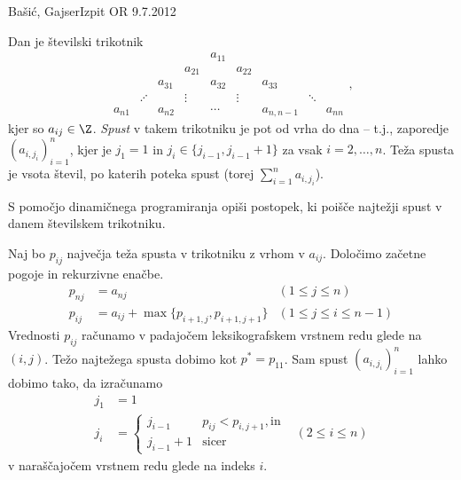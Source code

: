 \begin{naloga}{Bašić, Gajser}{Izpit OR 9.7.2012}
\begin{vprasanje}
Dan je številski trikotnik
$$
\begin{array}{ccccccccc}
                &&&& a_{11} \\
            &&& a_{21} && a_{22} \\
        && a_{31} && a_{32} && a_{33} \\
     & \iddots && \vdots && \vdots && \ddots \\
a_{n1} && a_{n2} && \cdots && a_{n,n-1} && a_{nn}
\end{array} ,
$$
kjer so $a_{ij} \in \Z$.
{\em Spust} v takem trikotniku je pot od vrha do dna
-- t.j., zaporedje $(a_{i, j_i})_{i=1}^n$,
kjer je $j_1 = 1$ in $j_i \in \{j_{i-1}, j_{i-1}+1\}$
za vsak $i = 2, \dots, n$.
Teža spusta je vsota števil, po katerih poteka spust
(torej $\sum_{i=1}^n a_{i, j_i}$).

S pomočjo dinamičnega programiranja opiši postopek,
ki poišče najtežji spust v danem številskem trikotniku.
\end{vprasanje}

\begin{odgovor}
Naj bo $p_{ij}$ največja teža spusta v trikotniku z vrhom v $a_{ij}$.
Določimo začetne pogoje in rekurzivne enačbe.
\begin{align*}
p_{nj} &= a_{nj} & (1 \le j \le n) \\
p_{ij} &= a_{ij} + \max\{p_{i+1,j}, p_{i+1,j+1}\} & (1 \le j \le i \le n-1)
\end{align*}
Vrednosti $p_{ij}$ računamo
v padajočem leksikografskem vrstnem redu glede na $(i, j)$.
Težo najtežega spusta dobimo kot $p^* = p_{11}$.
Sam spust $(a_{i, j_i})_{i=1}^n$ lahko dobimo tako,
da izračunamo
\begin{align*}
j_1 &= 1 \\
j_i &= \begin{cases}
j_{i-1} & p_{ij} < p_{i,j+1}, \text{in} \\
j_{i-1} + 1 & \text{sicer}
\end{cases}
& (2 \le i \le n)
\end{align*}
v naraščajočem vrstnem redu glede na indeks $i$.
\end{odgovor}
\end{naloga}
